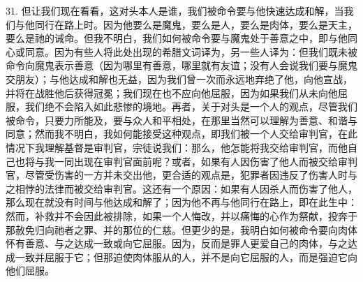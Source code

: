 31. 但让我们现在看看，这对头本人是谁，我们被命令要与他快速达成和解，当我们与他同行在路上时。因为他要么是魔鬼，要么是人，要么是肉体，要么是天主，要么是祂的诫命。但我不明白，我们如何被命令要与魔鬼处于善意之中，即与他同心或同意。因为有些人将此处出现的希腊文词译为，另一些人译为：但我们既未被命令向魔鬼表示善意（因为哪里有善意，哪里就有友谊；没有人会说我们要与魔鬼交朋友）；与他达成和解也无益，因为我们曾一次而永远地弃绝了他，向他宣战，并将在战胜他后获得冠冕；我们现在也不应向他屈服，因为如果我们从未向他屈服，我们绝不会陷入如此悲惨的境地。再者，关于对头是一个人的观点，尽管我们被命令，只要力所能及，要与众人和平相处，在那里当然可以理解为善意、和谐与同意；然而我不明白，我如何能接受这种观点，即我们被一个人交给审判官，在此情况下我理解基督是审判官，宗徒说我们：那么，他怎能将我交给审判官，而他自己也将与我一同出现在审判官面前呢？或者，如果有人因伤害了他人而被交给审判官，尽管受伤害的一方并未交出他，更合适的观点是，犯罪者因违反了伤害人时与之相悖的法律而被交给审判官。这还有一个原因：如果有人因杀人而伤害了他人，那么现在就没有时间与他达成和解了；因为他不再与他同行在路上，即在此生中：然而，补救并不会因此被排除，如果一个人悔改，并以痛悔的心作为祭献，投奔于那赦免归向祂者之罪、并的那位的仁慈。但更少的是，我明白如何被命令要向肉体怀有善意、与之达成一致或向它屈服。因为，反而是罪人更爱自己的肉体，与之达成一致并屈服于它；但那迫使肉体服从的人，并不是向它屈服的人，而是强迫它向他们屈服。\par

